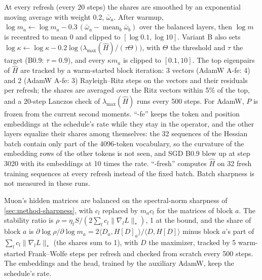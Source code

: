 \documentclass[10pt]{article}
\makeatletter
\renewcommand\paragraph{\@startsection{paragraph}{4}{\z@}{1.2ex \@plus .4ex \@minus .2ex}{-1em}{\normalfont\normalsize\bfseries}}
\DeclareMathOperator{\mean}{mean}
\newcommand{\lmax}{\lambda_{\max}}
\makeatother
\begin{document}
\paragraph{Updates.} At every refresh (every 20 steps) the shares are smoothed by an exponential moving average
with weight 0.2, $\bar\omega_a$. After warmup, $\log m_a\leftarrow\log m_a-0.3\,(\bar\omega_a-\mean_b\bar\omega_b)$
over the balanced layers, then $\log m$ is recentred to mean 0 and clipped to $[\log0.1,\log10]$. Variant B also
sets $\log\kappa\leftarrow\log\kappa-0.2\log\big(\lmax(\hat H)/(\tau\Theta)\big)$, with $\Theta$ the threshold and
$\tau$ the target (B0.9: $\tau=0.9$), and every $\kappa m_a$ is clipped to $[0.1,10]$. The top eigenpairs of $\hat
H$ are tracked by a warm-started block iteration: 3 vectors (AdamW A-fe: 4) and 2 (AdamW A-fe: 3) Rayleigh--Ritz
steps on the vectors and their residuals per refresh; the shares are averaged over the Ritz vectors within 5\% of the
top, and a 20-step Lanczos check of $\lmax(\hat H)$ runs every 500 steps. For AdamW, $P$ is frozen from the current
second moments. ``-fe'' keeps the token and position embeddings at the schedule's rate while they stay in the
operator, and the other layers equalize their shares among themselves: the 32 sequences of the Hessian batch
contain only part of the 4096-token vocabulary, so the curvature of the embedding rows of the other tokens is not
seen, and SGD B0.9 blew up at step 3020 with its embeddings at 10 times the rate. ``-fresh'' computes $\hat H$ on 32
fresh training sequences at every refresh instead of the fixed batch. Batch sharpness is not measured in these runs.

\paragraph{Muon.} Muon's hidden matrices are balanced on the spectral-norm sharpness of \cref{sec:method-sharpness},
with $c_l$ replaced by $m_ac_l$ for the matrices of block $a$. The stability ratio is
$\rho=\eta_tS/(2\sum_lc_l\|\nabla_lL\|_*)$, 1 at the bound, and the share of block $a$ is $\partial\log\rho/\partial\log
m_a=2\langle D_a,H[D]_a\rangle/\langle D,H[D]\rangle$ minus block $a$'s part of $\sum_lc_l\|\nabla_lL\|_*$ (the shares
sum to 1), with $D$ the maximizer, tracked by 5 warm-started Frank--Wolfe steps per refresh and checked from scratch
every 500 steps. The embeddings and the head, trained by the auxiliary AdamW, keep the schedule's rate.
\end{document}
